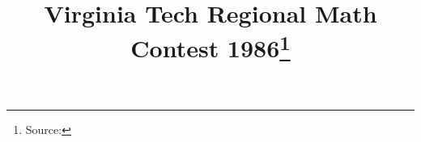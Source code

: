 \documentclass[10pt]{article}
\begin{document}
\title{Virginia Tech Regional Math Contest 1986\footnote{Source: \source}}
\author{\vspace{-2ex}}
\date{\vspace{-6ex}} %
\maketitle








\end{document}
